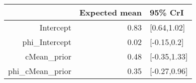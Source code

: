 \begin{tabular}{rrl}
  \hline
 & Expected mean & 95\% CrI \\ 
  \hline
Intercept & 0.83 & [0.64,1.02] \\ 
  phi\_Intercept & 0.02 & [-0.15,0.2] \\ 
  cMean\_prior & 0.48 & [-0.35,1.33] \\ 
  phi\_cMean\_prior & 0.35 & [-0.27,0.96] \\ 
   \hline
\end{tabular}

